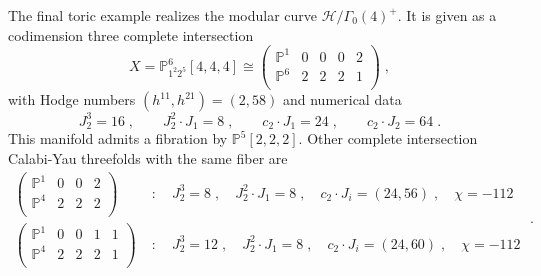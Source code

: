 \documentclass[11pt,a4paper]{article}
\numberwithin{equation}{section}
\numberwithin{table}{section}\setlength{\multlinegap}{25pt}
\begin{document}
The final toric example realizes the modular curve $\mathcal{H}/\Gamma_0(4)^+$. It is given as a codimension three complete intersection~\cite{Klemm:1995tj}
\begin{equation}
    X=\mathbb{P}_{1^2 2^5}^6[4,4,4]\cong
    \left(
    \begin{array}{c|cccc}
        \mathbb{P}^1 & 0 & 0 & 0 & 2\\
        \mathbb{P}^6 & 2 & 2 & 2 & 1\\
    \end{array}
    \right)\;,
\end{equation}
with Hodge numbers $(h^{11},h^{21})=(2,58)$ and numerical data
\begin{equation}
    J_2^3=16\;,\qquad J_2^2\cdot J_1=8\;,\qquad c_2\cdot J_1=24\;,\qquad c_2\cdot J_2=64\;.
\end{equation}
This manifold admits a fibration by $\mathbb{P}^5[2,2,2]$. Other complete intersection Calabi-Yau threefolds with the same fiber are
\begin{equation}
    \begin{aligned}
        \left(
        \begin{array}{c|ccc}
            \mathbb{P}^1 & 0 & 0 & 2\\
            \mathbb{P}^4 & 2 & 2 & 2\\
        \end{array}
        \right)\;&:\quad
        J_2^3=8\;,\quad J_2^2\cdot J_1=8\;,\quad
        c_2\cdot J_i=(24,56)\;,\quad
        \chi=-112
        \\
        \left(
        \begin{array}{c|cccc}
            \mathbb{P}^1 & 0 & 0 & 1 & 1\\
            \mathbb{P}^4 & 2 & 2 & 2 & 1\\
        \end{array}
        \right)\;&:\quad
        J_2^3=12\;,\quad J_2^2\cdot J_1=8\;,\quad
        c_2\cdot J_i=(24,60)\;,\quad
        \chi=-112
        \end{aligned}\;.
\end{equation}
\end{document}
